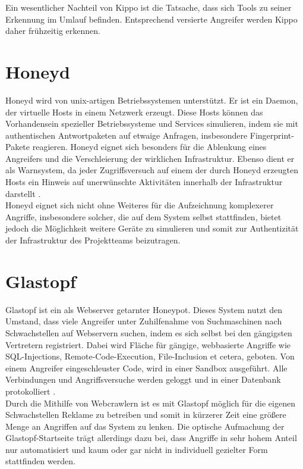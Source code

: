 Ein wesentlicher Nachteil von Kippo ist die Tatsache, dass sich Tools zu seiner Erkennung im Umlauf befinden. Entsprechend versierte Angreifer werden Kippo daher frühzeitig erkennen.

\section{Honeyd}
\label{sec:Honeyd}
Honeyd wird von unix-artigen Betriebssystemen unterstützt. Er ist ein Daemon, der virtuelle Hosts in einem Netzwerk erzeugt. Diese Hosts können das Vorhandensein spezieller Betriebssysteme und Services simulieren, indem sie mit authentischen Antwortpaketen auf etwaige Anfragen, insbesondere Fingerprint-Pakete reagieren. Honeyd eignet sich besonders für die Ablenkung eines Angreifers und die Verschleierung der wirklichen Infrastruktur. Ebenso  dient er als Warnsystem, da jeder Zugriffsversuch auf einem der durch Honeyd erzeugten Hosts ein Hinweis auf unerwünschte Aktivitäten innerhalb der Infrastruktur darstellt \cite{Honeyd16}.\\

Honeyd eignet sich nicht ohne Weiteres für die Aufzeichnung komplexerer Angriffe, insbesondere solcher, die auf dem System selbst stattfinden, bietet jedoch die Möglichkeit weitere Geräte zu simulieren und somit zur Authentizität der Infrastruktur des Projektteams beizutragen.

\section{Glastopf}
\label{sec:Glastopf}

Glastopf ist ein als Webserver getarnter Honeypot. Dieses System nutzt den Umstand, dass viele Angreifer unter Zuhilfenahme von Suchmaschinen nach Schwachstellen auf Webservern suchen, indem es sich selbst bei den gängigsten Vertretern registriert. Dabei wird Fläche für gängige, webbasierte Angriffe wie SQL-Injections, Remote-Code-Execution, File-Inclusion et cetera, geboten. Von einem Angreifer eingeschleuster Code, wird in einer Sandbox ausgeführt. Alle Verbindungen und Angriffsversuche werden geloggt und in einer Datenbank protokolliert \cite{Glastopf16}.\\

Durch die Mithilfe von Webcrawlern ist es mit Glastopf möglich für die eigenen Schwachstellen Reklame zu betreiben und somit in kürzerer Zeit eine größere Menge an Angriffen auf das System zu lenken. Die optische Aufmachung der Glastopf-Startseite trägt allerdings dazu bei, dass Angriffe in sehr hohem Anteil nur automatisiert und kaum oder gar nicht in individuell gezielter Form stattfinden werden.
